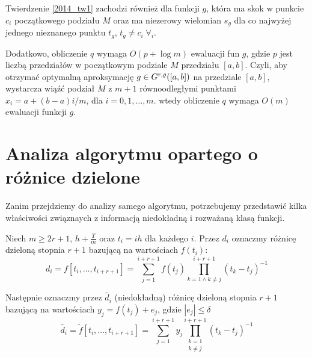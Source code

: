 \documentclass[oik, pdftex, robocza, man]{mgrwms}
\begin{document}
    \begin{uw}
        Twierdzenie \eqref{2014_tw1} zachodzi również dla funkcji $g$, która ma skok w punkcie $c_{i}$ początkowego podziału $M$ oraz ma niezerowy wielomian $s_{g}$ dla co najwyżej jednego nieznanego punktu $t_{g}$, $t_{g} \neq c_{i} \; \forall_{i}$.
    \end{uw}

    Dodatkowo, obliczenie $q$ wymaga $O(p+\log m)$ ewaluacji fun $g$, gdzie $p$ jest liczbą przedziałów w początkowym podziale $M$ przedziału $[a,b]$. Czyli, aby otrzymać optymalną aproksymację $g \in G^{r,\varrho}([a,b])$ na przedziale $[a,b]$, wystarcza wiąźć podział $M$ z $m+1$ równoodległymi punktami $x_{i} = a+(b-a)i/m$, dla $i=0,1,\dots,m$. wtedy obliczenie $q$ wymaga $O(m)$ ewaluacji funkcji $g$.


\section{Analiza algorytmu opartego o różnice dzielone}


    Zanim przejdziemy do analizy samego algorytmu, potrzebujemy przedstawić kilka właściwości związnaych z informacją niedokładną i rozważaną klasą funkcji.

    Niech $m \geq 2r + 1$, $h + \frac{T}{m}$ oraz $t_{i} = ih$ dla każdego $i$. Przez $d_{i}$ oznaczmy różnicę dzieloną stopnia $r+1$ bazującą na wartościach $f(t_{i})$:
    \begin{equation*}
        d_{i} = f[t_{i}, \dots, t_{i+r+1}] = \sum_{j = 1}^{i+r+1} f(t_{j}) \prod_{k=1 \land k \neq j}^{i+r+1}(t_{k}-t_{j})^{-1}
    \end{equation*}

    Następnie oznaczmy przez $\tilde{d_i}$ (niedokładną) różnicę dzieloną stopnia $r+1$ bazującą na wartościach $y_{j} = f(t_{j}) + e_{j}$, gdzie $|e_{j}| \leq \delta$
    \begin{equation*}
        \tilde{d_{i}} = \tilde{f}[t_{i}, \dots, t_{i+r+1}] = \sum_{j = 1}^{i+r+1} y_{j} \prod_{\substack{k=1 \\ k \neq j}}^{i+r+1}(t_{k}-t_{j})^{-1}
    \end{equation*}
\end{document}

